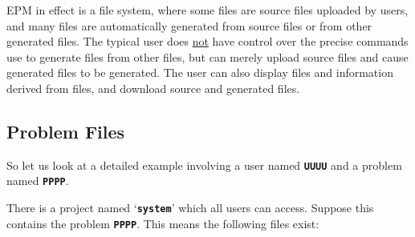 \documentclass[12pt]{article}
\newcommand{\TT}[1]{{\tt \bfseries #1}}
\begin{document}
EPM in effect is a file system, where some files are source
files uploaded by users, and many files are automatically
generated from source files or from other generated files.
The typical user does \underline{not} have control over
the precise commands use to generate files from other
files, but can merely upload source files and cause generated
files to be generated.  The user can also display files
and information derived from files, and download source
and generated files.

\subsection{Problem Files}

So let us look at a detailed example involving a user named
\TT{UUUU} and a problem named \TT{PPPP}.

There is a project named `\TT{system}' which all users can access.
Suppose this contains the problem \TT{PPPP}.  This means the
following files exist:
\end{document}
